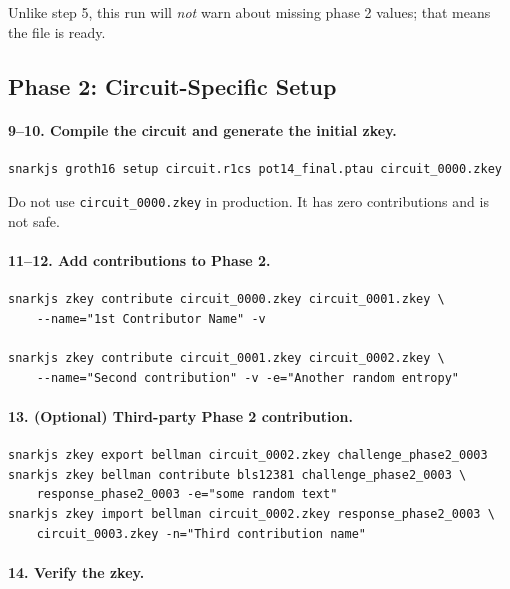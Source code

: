 Unlike step 5, this run will \emph{not} warn about missing phase 2 values; that means the file is ready.

\subsection*{Phase 2: Circuit-Specific Setup}

\paragraph{9--10. Compile the circuit and generate the initial zkey.}

\begin{verbatim}
snarkjs groth16 setup circuit.r1cs pot14_final.ptau circuit_0000.zkey
\end{verbatim}

\begin{remark}
Do not use \texttt{circuit\_0000.zkey} in production. It has zero contributions and is not safe.
\end{remark}

\paragraph{11--12. Add contributions to Phase 2.}

\begin{verbatim}
snarkjs zkey contribute circuit_0000.zkey circuit_0001.zkey \
    --name="1st Contributor Name" -v

snarkjs zkey contribute circuit_0001.zkey circuit_0002.zkey \
    --name="Second contribution" -v -e="Another random entropy"
\end{verbatim}

\paragraph{13. (Optional) Third-party Phase 2 contribution.}

\begin{verbatim}
snarkjs zkey export bellman circuit_0002.zkey challenge_phase2_0003
snarkjs zkey bellman contribute bls12381 challenge_phase2_0003 \
    response_phase2_0003 -e="some random text"
snarkjs zkey import bellman circuit_0002.zkey response_phase2_0003 \
    circuit_0003.zkey -n="Third contribution name"
\end{verbatim}

\paragraph{14. Verify the zkey.}

